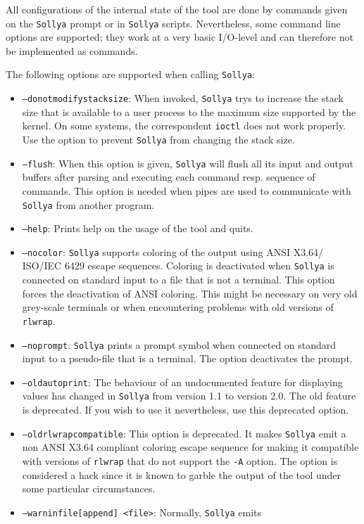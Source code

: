 \documentclass[a4paper]{article}
\newcommand{\sollya}{\texttt{Sollya}\xspace}
\begin{document}
All configurations of the internal state of the tool are done by
commands given on the \sollya prompt or in \sollya
scripts. Nevertheless, some command line options are supported; they
work at a very basic I/O-level and can therefore not be implemented as
commands.

The following options are supported when calling \sollya:
\begin{itemize}
\item \texttt{--donotmodifystacksize}: When invoked, \sollya trys to increase
the stack size that is available to a user process to the maximum size
supported by the kernel. On some systems, the correspondent \texttt{ioctl} 
does not work properly. Use the option to prevent \sollya from changing the 
stack size.
\item \texttt{--flush}: When this option is given, \sollya will flush
all its input and output buffers after parsing and executing each
command resp. sequence of commands. This option is needed when pipes
are used to communicate with \sollya from another program.
\item \texttt{--help}: Prints help on the usage of the tool and quits.
\item \texttt{--nocolor}: \sollya supports coloring of the output
  using ANSI X3.64/ ISO/IEC 6429 escape sequences. Coloring is
  deactivated when \sollya is connected on standard input to a file
  that is not a terminal. This option forces the deactivation of ANSI
  coloring. This might be necessary on very old grey-scale terminals or when
  encountering problems with old versions of \texttt{rlwrap}. 
\item \texttt{--noprompt}: \sollya prints a prompt symbol when
  connected on standard input to a pseudo-file that is a terminal. The
  option deactivates the prompt.
\item \texttt{--oldautoprint}: The behaviour of an undocumented
feature for displaying values has changed in \sollya from version 1.1
to version 2.0. The old feature is deprecated. If you wish to use it
nevertheless, use this deprecated option.
\item \texttt{--oldrlwrapcompatible}: This option is deprecated. It
  makes \sollya emit a non ANSI X3.64 compliant coloring escape
  sequence for making it compatible with versions of \texttt{rlwrap}
  that do not support the \texttt{-A} option. The option is considered
  a hack since it is known to garble the output of the tool under
  some particular circumstances.
\item \texttt{--warninfile[append] <file>}: Normally, \sollya emits

\end{itemize}
\end{document}
